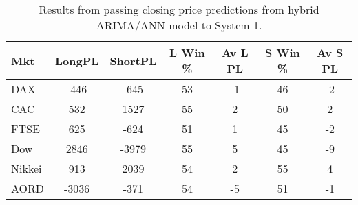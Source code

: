 \begin{table}[ht]
\centering
\caption[Results from passing closing price predictions from hybrid ARIMA/ANN model to System 1]{Results from passing closing price predictions from hybrid ARIMA/ANN model to System 1.} 
\label{tab:chp_ts:arima_ann_sys1}
\begin{tabular}{lcccccc}
  \toprule Mkt & LongPL & ShortPL & L Win \% & Av L PL & S Win \% & Av S PL \\ 
  \midrule DAX & -446 & -645 & 53 & -1 & 46 & -2 \\ 
  CAC & 532 & 1527 & 55 & 2 & 50 & 2 \\ 
  FTSE & 625 & -624 & 51 & 1 & 45 & -2 \\ 
  Dow & 2846 & -3979 & 55 & 5 & 45 & -9 \\ 
  Nikkei & 913 & 2039 & 54 & 2 & 55 & 4 \\ 
  AORD & -3036 & -371 & 54 & -5 & 51 & -1 \\ 
   \bottomrule \end{tabular}
\end{table}
